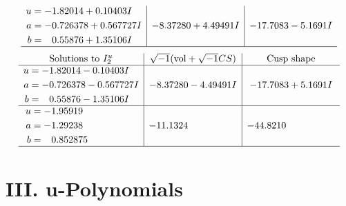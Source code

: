\documentclass[1p]{elsarticle_modified}
\theoremstyle{definition}
\newcommand{\I}{\sqrt{-1}}
\begin{document}
$$\begin{array}{c|c|c}
\begin{aligned}
u &= -1.82014 + 0.10403 I \\
a &= -0.726378 + 0.567727 I \\
b &= \phantom{-}0.55876 + 1.35106 I\end{aligned}
 & -8.37280 + 4.49491 I & -17.7083 - 5.1691 I\\
 \hline 
 \end{array}$$\newpage$$\begin{array}{c|c|c}  
\text{Solutions to }I^u_{2}& \I (\text{vol} + \sqrt{-1}CS) & \text{Cusp shape}\\
 \hline 
\begin{aligned}
u &= -1.82014 - 0.10403 I \\
a &= -0.726378 - 0.567727 I \\
b &= \phantom{-}0.55876 - 1.35106 I\end{aligned}
 & -8.37280 - 4.49491 I & -17.7083 + 5.1691 I \\ \hline\begin{aligned}
u &= -1.95919\phantom{ +0.000000I} \\
a &= -1.29238\phantom{ +0.000000I} \\
b &= \phantom{-}0.852875\phantom{ +0.000000I}\end{aligned}
 & -11.1324\phantom{ +0.000000I} & -44.8210\phantom{ +0.000000I}\\
 \hline 
 \end{array}$$\newpage
\newpage\renewcommand{\arraystretch}{1}
\centering \section*{ III. u-Polynomials}
\end{document}
